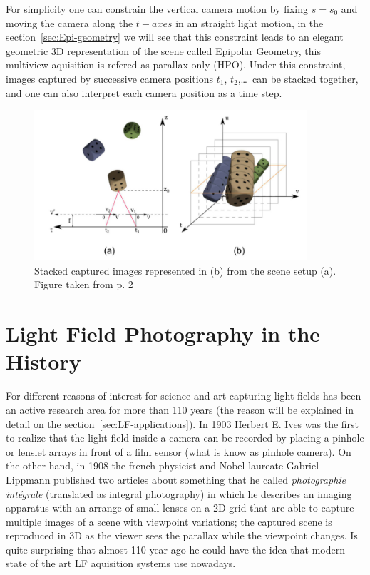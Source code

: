 \bigskip

For simplicity one can constrain the vertical camera motion by fixing $s = s_0$ and moving the camera along the $t-axes$ in an straight light motion, in the section~\ref{sec:Epi-geometry} we will see that this constraint leads to an elegant geometric 3D representation of the scene called Epipolar Geometry, this multiview aquisition is refered as parallax only (HPO). Under this constraint, images captured by successive camera positions $t_1$, $t_2$,\ldots\ can be stacked together, and one can also interpret each camera position as a time step.

\bigskip

\begin{figure}[h!]
\centering
\includegraphics[width= 0.90\textwidth]{./Diagrams/images_stacked.jpg}
\caption{Stacked captured images represented in (b) from the scene setup (a). Figure taken from \cite{LF-Shearlets} p. 2}
\end{figure}

\section{Light Field Photography in the History}

For different reasons of interest for science and art capturing light fields has been an active research area for more than 110 years (the reason will be explained in detail on the section~\ref{sec:LF-applications}). In 1903 Herbert E. Ives \cite{Ives} was the first to realize that the light field inside a camera can be recorded by placing a pinhole or lenslet arrays in front of a film sensor (what is know as pinhole camera). On the other hand, in 1908 the french physicist and Nobel laureate Gabriel Lippmann published two articles about something that he called \textit{photographie int\'egrale} (translated as integral photography) \cite{Lippmann} in which he describes an imaging apparatus with an arrange of small lenses on a 2D grid that are able to capture multiple images of a scene with viewpoint variations; the captured scene is reproduced in 3D as the viewer sees the parallax while the viewpoint changes. Is quite surprising that almost 110 year ago he could have the idea that modern state of the art LF aquisition systems use nowadays. 

